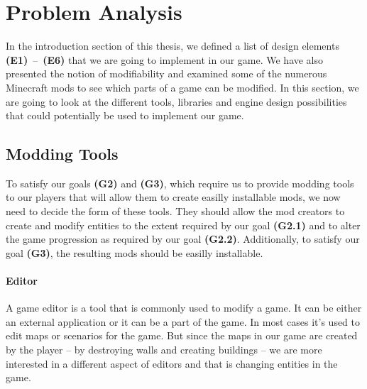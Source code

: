 \chapter{Problem Analysis}

In the introduction section of this thesis, we defined a list of design elements \textbf{(E1)}~--~\textbf{(E6)} that we are going to
implement in our game. We have also presented the notion of modifiability and examined some of
the numerous Minecraft mods to see which parts of a game can be modified. In this section, we are
going to look at the different tools, libraries and engine design possibilities that could potentially
be used to implement our game.

\section{Modding Tools}

To satisfy our goals \textbf{(G2)} and \textbf{(G3)}, which require us to provide modding tools to our players that will allow
them to create easilly installable mods, we now need to decide the form of these tools. They should allow the mod creators
to create and modify entities to the extent required by our goal \textbf{(G2.1)} and to alter the game progression as required
by our goal \textbf{(G2.2)}. Additionally, to satisfy our goal \textbf{(G3)}, the resulting mods should be easilly installable.

\subsubsection{Editor}

A game editor is a tool that is commonly used to modify a game. It can be either an external application
or it can be a part of the game. In most cases it's used to edit maps or scenarios for the game.
But since the maps in our game are created by the player -- by destroying walls and creating buildings -- we are more interested in a
different aspect of editors and that is changing entities in the game.

